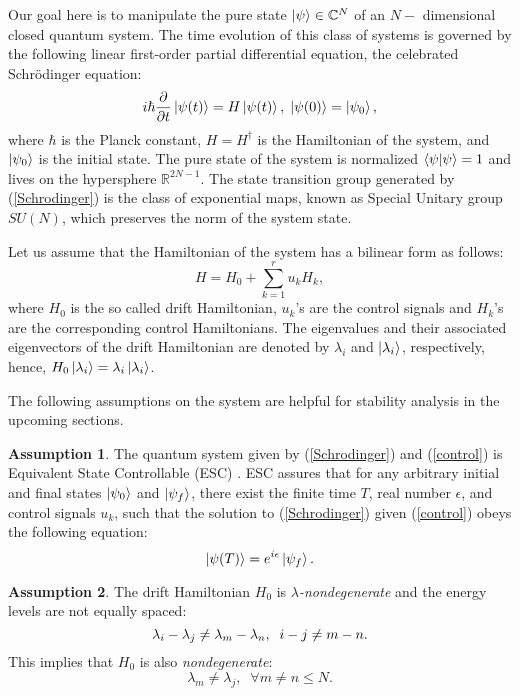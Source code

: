 \documentclass[journal]{IEEEtran}
\theoremstyle{definition}
\newtheorem{assum}{Assumption}
\begin{document}
Our goal here is to manipulate the pure state $\ket{\psi} \in \mathbb{C}^N$ of an $N-$ dimensional closed quantum system. The time evolution of this class of systems is governed by the following linear first-order partial differential equation, the celebrated Schr\"{o}dinger equation:
\begin{equation}\label{Schrodinger}
  i\hbar \frac{\partial }{\partial t}\ket{\psi{(t)}}= H \ket{\psi{(t)}}, \; \ket{\psi{(0)}}=\ket{\psi_0},
 \end{equation}
 where $\hbar$ is the Planck constant, $H=H^{\dag}$ is the Hamiltonian of the system, and $\ket{\psi_0}$ is the initial state. The pure state of the system is normalized $\braket{\psi|\psi}=1$ and lives on the hypersphere $\mathbb{R}^{2N-1}$.  The state transition group generated by (\ref{Schrodinger}) is the class of exponential maps, known as Special Unitary group $SU(N)$, which preserves the norm of the system state.
 
Let us assume that the Hamiltonian of the system has a bilinear form as follows:
\begin{equation}\label{control}
   H=H_0+\sum_{k=1}^{r} {u_k H_k},
\end{equation}
where $H_0$ is the so called drift Hamiltonian, $u_k$'s are the control signals and $H_k$'s are the corresponding control Hamiltonians. The eigenvalues and their associated eigenvectors of the drift Hamiltonian are denoted by $\lambda_i$ and $\ket{\lambda_i}$,  respectively, hence, $H_0\ket{\lambda_i}=\lambda_i \ket{\lambda_i}$.

The following assumptions on the system are helpful for stability analysis in the upcoming sections.
\begin{assum} The quantum system given by (\ref{Schrodinger}) and (\ref{control}) is Equivalent State Controllable (ESC) \cite{d2007introduction,albertini2003notions}. ESC assures that for any arbitrary initial and final states $\ket{\psi_0}$ and $\ket{\psi_f}$, there exist the finite time $T$, real number $\epsilon$, and control signals $u_k$, such that the solution to (\ref{Schrodinger}) given (\ref{control}) obeys the following equation:
$$
\ket{\psi(T)}=e^{i\epsilon}\ket{\psi_f}.
$$
\end{assum}
\begin{assum}\label{lambda}
The drift Hamiltonian $H_0$ is \textit{$\lambda$-nondegenerate} and the energy levels are not equally spaced:
\begin{equation}{\label{nondeg}}
    {\lambda_i}-{\lambda_j}\neq{\lambda_m}-{\lambda_n}, \;\;  i-j\neq m-n.
\end{equation}
This implies that $H_0$ is also \textit{nondegenerate}:
\begin{equation}\label{lambda1}
    \lambda_m\neq \lambda_j, \;\; \forall m \neq n\leq N.
\end{equation}
\end{assum}
\end{document}
